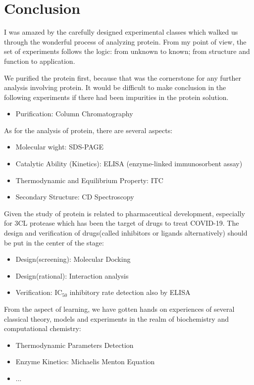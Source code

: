 \documentclass{report}
\begin{document}
\chapter{Conclusion}
I was amazed by the carefully designed experimental classes which walked us through the wonderful process of analyzing protein.
From my point of view, the set of experiments follows the logic: from unknown to known; from structure and function to application.

We purified the protein first, because that was the cornerstone for any further analysis involving protein.
It would be difficult to make conclusion in the following experiments if there had been impurities in the protein solution.
\begin{itemize}
    \item Purification: Column Chromatography
\end{itemize}
As for the analysis of protein, there are several aspects:
\begin{itemize}
    \item Molecular wight: SDS-PAGE
    \item Catalytic Ability (Kinetics): ELISA (enzyme-linked immunosorbent assay)
    \item Thermodynamic and Equilibrium Property: ITC
    \item Secondary Structure: CD Spectroscopy
\end{itemize}

Given the study of protein is related to pharmaceutical development, especially for 3CL protease which has been the target of drugs to treat COVID-19.
The design and verification of drugs(called inhibitors or ligands alternatively) should be put in the center of the stage:
\begin{itemize}
    \item Design(screening): Molecular Docking
    \item Design(rational): Interaction analysis
    \item Verification: IC$_{50}$ inhibitory rate detection also by ELISA
\end{itemize}

From the aspect of learning, we have gotten hands on experiences of several classical theory, models and experiments in the realm of biochemistry and computational chemistry:
\begin{itemize}
    \item Thermodynamic Parameters Detection
    \item Enzyme Kinetics: Michaelis Menton Equation
    \item ...
\end{itemize}
\end{document}
